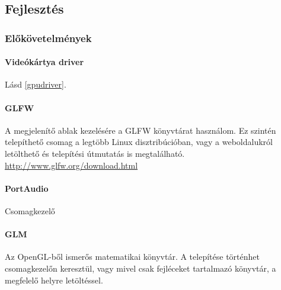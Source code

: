 
\subsection{Fejleszt\'es}
\subsubsection{El\H ok\"ovetelm\'enyek}
\paragraph{Vide\'ok\'artya driver}
L\'asd \ref{gpudriver}.

\paragraph{GLFW}
A megjelen\'it\H o ablak kezel\'es\'ere a GLFW k\"onyvt\'arat haszn\'alom. Ez szint\'en telep\'ithet\H o csomag a legt\"obb Linux disztrib\'uci\'oban, vagy a weboldalukr\'ol let\"olthet\H o \'es telep\'it\'esi \'utmutat\'as is megtal\'alhat\'o. \url{http://www.glfw.org/download.html}

\paragraph{PortAudio}
Csomagkezel\H o

\paragraph{GLM}
Az OpenGL-b\H ol ismer\H os matematikai k\"onyvt\'ar. 
A telep\'it\'ese t\"ort\'enhet csomagkezel\H on kereszt\"ul, vagy mivel csak fejl\'eceket tartalmaz\'o k\"onyvt\'ar, a megfelel\H o helyre let\"olt\'essel.

